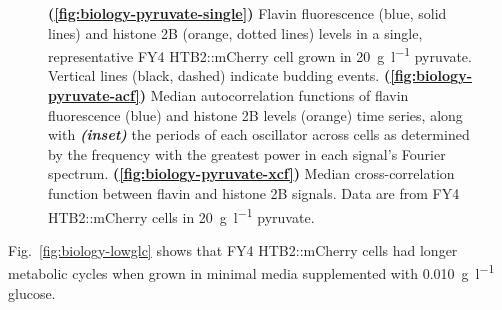 \begin{figure}[p]
  \caption[
    Flavin fluorescence and histone 2B levels in a single, representative FY4 HTB2::mCherry cell grown in \SI{20}{\gram~\litre^{-1}} pyruvate.
    Median autocorrelation functions of flavin fluorescence and histone 2B levels time series, along with the periods of each oscillator across cells.
    Median cross-correlation function between flavin and histone 2B signals.
    Data are from FY4 HTB2::mCherry cells in \SI{20}{\gram~\litre^{-1}} pyruvate.
  ]{
    \textbf{(\ref{fig:biology-pyruvate-single})}
    Flavin fluorescence (blue, solid lines) and histone 2B (orange, dotted lines) levels in a single, representative FY4 HTB2::mCherry cell grown in \SI{20}{\gram~\litre^{-1}} pyruvate.
    Vertical lines (black, dashed) indicate budding events.
    \textbf{(\ref{fig:biology-pyruvate-acf})}
    Median autocorrelation functions of flavin fluorescence (blue) and histone 2B levels (orange) time series, along with \textit{\textbf{(inset)}} the periods of each oscillator across cells as determined by the frequency with the greatest power in each signal's Fourier spectrum.
    \textbf{(\ref{fig:biology-pyruvate-xcf})}
    Median cross-correlation function between flavin and histone 2B signals.
    Data are from FY4 HTB2::mCherry cells in \SI{20}{\gram~\litre^{-1}} pyruvate.
  }
  \label{fig:biology-pyruvate}
\end{figure}


\pagebreak

Fig.\ \ref{fig:biology-lowglc} shows that FY4 HTB2::mCherry cells had longer metabolic cycles when grown in minimal media supplemented with \SI{0.010}{\gram~\litre^{-1}} glucose.

